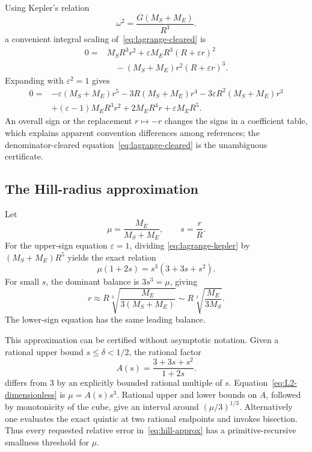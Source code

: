Using Kepler's relation
\[
 \omega^2=\frac{G(M_S+M_E)}{R^3}.
\]
a convenient integral scaling of~\eqref{eq:lagrange-cleared} is
\begin{equation}\label{eq:lagrange-kepler}
 \begin{split}
 0={}&M_SR^3r^2+\varepsilon M_ER^3(R+\varepsilon r)^2\\
    &\quad-(M_S+M_E)r^2(R+\varepsilon r)^3.
 \end{split}
\end{equation}
Expanding with \(\varepsilon^2=1\) gives
\begin{equation}\label{eq:lagrange-expanded}
 \begin{split}
 0={}&-\varepsilon(M_S+M_E)r^5
      -3R(M_S+M_E)r^4
      -3\varepsilon R^2(M_S+M_E)r^3\\
    &+(\varepsilon-1)M_ER^3r^2
      +2M_ER^4r+\varepsilon M_ER^5.
 \end{split}
\end{equation}
An overall sign or the replacement \(r\mapsto-r\) changes the signs in a
coefficient table, which explains apparent convention differences among
references; the denominator-cleared equation~\eqref{eq:lagrange-cleared} is the
unambiguous certificate.

\subsection{The Hill-radius approximation}

Let
\[
 \mu=\frac{M_E}{M_S+M_E},
 \qquad s=\frac rR.
\]
For the upper-sign equation \(\varepsilon=1\), dividing
\eqref{eq:lagrange-kepler} by \((M_S+M_E)R^5\) yields the exact relation
\begin{equation}\label{eq:L2-dimensionless}
 \mu(1+2s)=s^3(3+3s+s^2).
\end{equation}
For small \(s\), the dominant balance is \(3s^3=\mu\), giving
\begin{equation}\label{eq:hill-approx}
 r\approx R\sqrt[3]{\frac{M_E}{3(M_S+M_E)}}
 \sim R\sqrt[3]{\frac{M_E}{3M_S}}.
\end{equation}
The lower-sign equation has the same leading balance.

This approximation can be certified without asymptotic notation.  Given a
rational upper bound \(s\le\delta<1/2\), the rational factor
\[
 A(s)=\frac{3+3s+s^2}{1+2s}.
\]
differs from \(3\) by an explicitly bounded rational multiple of \(s\).
Equation~\eqref{eq:L2-dimensionless} is \(\mu=A(s)s^3\).  Rational upper and
lower bounds on \(A\), followed by monotonicity of the cube, give an interval
around \((\mu/3)^{1/3}\).  Alternatively one evaluates the exact quintic at two
rational endpoints and invokes bisection.  Thus every requested relative error
in~\eqref{eq:hill-approx} has a primitive-recursive smallness threshold for
\(\mu\).

